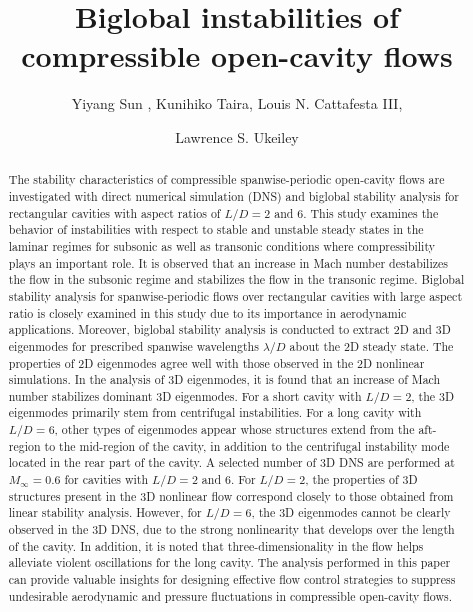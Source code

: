 \documentclass{jfm}
\title{Biglobal instabilities of compressible open-cavity flows}
\author{Yiyang Sun\aff{1}
  \corresp{\email{ys12d@my.fsu.edu}},
  Kunihiko Taira\aff{1},
  Louis N. Cattafesta III\aff{1},
 \and Lawrence S. Ukeiley\aff{2}}
\affiliation{\aff{1}Department of Mechanical Engineering, Florida State University, Tallahassee, FL 32310, USA
\aff{2}Department of Mechanical and Aerospace Engineering, University of Florida, Gainesville, FL 32611, USA}
\begin{document}
\maketitle

\begin{abstract}

The stability characteristics of compressible spanwise-periodic open-cavity flows are investigated with direct numerical simulation (DNS) and biglobal stability analysis for rectangular cavities with aspect ratios of $L/D=2$ and 6. This study examines the behavior of instabilities with respect to stable and unstable steady states in the laminar regimes
for subsonic %
as well as transonic conditions %
where compressibility plays an important role. 
It is observed that an increase in Mach number destabilizes the flow in the subsonic regime and stabilizes the flow in the transonic regime.  Biglobal stability analysis for spanwise-periodic flows over rectangular cavities with large aspect ratio is closely examined in this study due to its importance in aerodynamic applications.
Moreover, biglobal stability analysis is conducted to extract 2D and 3D eigenmodes for prescribed spanwise wavelengths $\lambda/D$ about the 2D steady state. The properties of 2D eigenmodes agree well with those observed in the 2D nonlinear simulations. In the analysis of 3D eigenmodes, it is found that an increase of Mach number stabilizes dominant 3D eigenmodes. For a short cavity with $L/D=2$, the 3D eigenmodes primarily stem from centrifugal instabilities. For a long cavity with $L/D=6$, other types of eigenmodes appear whose structures extend from the aft-region to the mid-region of the cavity, in addition to the centrifugal instability mode located in the rear part of the cavity. A selected number of 3D DNS are performed at $M_\infty=0.6$ for cavities with $L/D=2$ and 6. For $L/D=2$, the properties of 3D structures present in the 3D nonlinear flow correspond closely to those obtained from linear stability analysis. However, for $L/D=6$, the 3D eigenmodes cannot be clearly observed in the 3D DNS, due to the strong nonlinearity that develops over the length of the cavity. In addition, it is noted that three-dimensionality in the flow helps alleviate %
violent oscillations for the long cavity. The analysis performed in this paper can provide valuable insights for designing effective flow control strategies to suppress undesirable aerodynamic and pressure fluctuations in compressible open-cavity flows.
\end{abstract}
\end{document}
